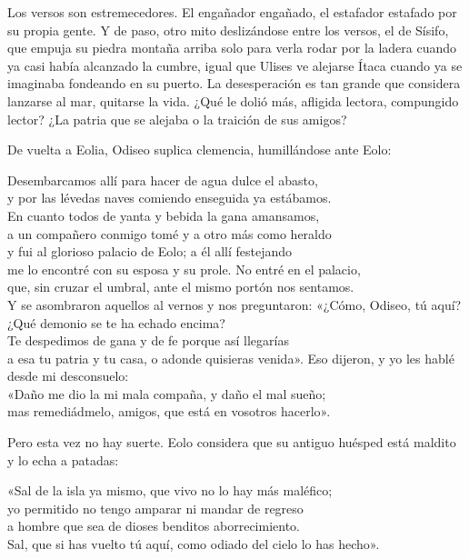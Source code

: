 Los versos son estremecedores. El engañador engañado, el estafador estafado por su propia gente. Y de paso, otro mito deslizándose entre los versos, el de Sísifo, que empuja su piedra montaña arriba solo para verla rodar por la ladera cuando ya casi había alcanzado la cumbre, igual que Ulises ve alejarse Ítaca cuando ya se imaginaba fondeando en su puerto. La desesperación es tan grande que considera lanzarse al mar, quitarse la vida. ¿Qué le dolió más, afligida lectora, compungido lector? ¿La patria que se alejaba o la traición de sus amigos?

De vuelta a Eolia, Odiseo suplica clemencia, humillándose ante Eolo:

\begin{versocita}
Desembarcamos allí para hacer de agua dulce el abasto,\\
y por las lévedas naves comiendo enseguida ya estábamos.\\
En cuanto todos de yanta y bebida la gana amansamos,\\
a un compañero conmigo tomé y a otro más como heraldo\\
y fui al glorioso palacio de Eolo; a él allí festejando\\
me lo encontré con su esposa y su prole. No entré en el palacio,\\
que, sin cruzar el umbral, ante el mismo portón nos sentamos.\\
Y se asombraron aquellos al vernos y nos preguntaron:
\stanzabreak
«¿Cómo, Odiseo, tú aquí? ¿Qué demonio se te ha echado encima?\\
Te despedimos de gana y de fe porque así llegarías\\
a esa tu patria y tu casa, o adonde quisieras venida».
\stanzabreak
Eso dijeron, y yo les hablé desde mi desconsuelo:\\
«Daño me dio la mi mala compaña, y daño el mal sueño;\\
mas remediádmelo, amigos, que está en vosotros hacerlo».
\end{versocita}

Pero esta vez no hay suerte. Eolo considera que su antiguo huésped está maldito y lo echa a patadas:

\begin{versocita}
«Sal de la isla ya mismo, que vivo no lo hay más maléfico;\\
yo permitido no tengo amparar ni mandar de regreso\\
a hombre que sea de dioses benditos aborrecimiento.\\
Sal, que si has vuelto tú aquí, como odiado del cielo lo has hecho».
\end{versocita}

